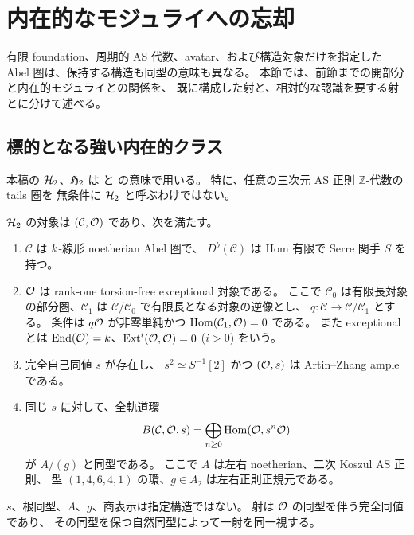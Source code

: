 \section{内在的なモジュライへの忘却}
\label{sec:qa-intrinsic-forgetting}

有限 foundation、周期的 AS 代数、avatar、および構造対象だけを指定した
Abel 圏は、保持する構造も同型の意味も異なる。
本節では、前節までの開部分と内在的モジュライとの関係を、
既に構成した射と、相対的な認識を要する射とに分けて述べる。

\subsection{標的となる強い内在的クラス}

本稿の \(\mathcal H_2\)、\(\mathfrak H_2\) は
\cite[\texttt{def:h2}]{QuadricIntrinsic2026} と
\cite[\texttt{def:relative-h2}]{QuadricModuli2026} の意味で用いる。
特に、任意の三次元 AS 正則 \(\mathbb Z\)-代数の tails 圏を
無条件に \(\mathcal H_2\) と呼ぶわけではない。

\begin{definition}[体上の強い内在的クラス]
\label{def:qa-h2}
\(\mathcal H_2\) の対象は \((\mathcal C,\mathcal O)\) であり、次を満たす。
\begin{enumerate}
\item \(\mathcal C\) は \(k\)-線形 noetherian Abel 圏で、
\(D^b(\mathcal C)\) は Hom 有限で Serre 関手 \(S\) を持つ。
\item \(\mathcal O\) は rank-one torsion-free exceptional 対象である。
ここで $\mathcal C_0$ は有限長対象の部分圏、$\mathcal C_1$ は
$\mathcal C/\mathcal C_0$ で有限長となる対象の逆像とし、
$q:\mathcal C\to\mathcal C/\mathcal C_1$ とする。
条件は $q\mathcal O$ が非零単純かつ $\operatorname{Hom}(\mathcal C_1,\mathcal O)=0$ である。
また exceptional とは $\operatorname{End}(\mathcal O)=k$、$\operatorname{Ext}^{i}(\mathcal O,\mathcal O)=0$ ($i>0$) をいう。
\item 完全自己同値 \(s\) が存在し、
\(s^2\simeq S^{-1}[2]\) かつ \((\mathcal O,s)\) は Artin--Zhang ample である。
\item 同じ \(s\) に対して、全軌道環
\[
 B(\mathcal C,\mathcal O,s)
   =\bigoplus_{n\ge0}\operatorname{Hom}(\mathcal O,s^n\mathcal O)
\]
が \(A/(g)\) と同型である。
ここで \(A\) は左右 noetherian、二次 Koszul AS 正則、
型 \((1,4,6,4,1)\) の環、\(g\in A_2\) は左右正則正規元である。
\end{enumerate}
\(s\)、根同型、\(A\)、\(g\)、商表示は指定構造ではない。
射は \(\mathcal O\) の同型を伴う完全同値であり、
その同型を保つ自然同型によって一射を同一視する。
\end{definition}

